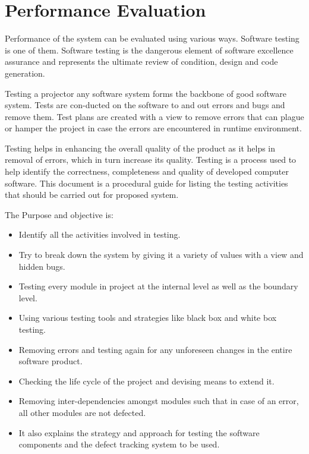 \documentclass[12pt, a4paper]{report}
\begin{document}
\chapter{Performance Evaluation}

Performance of the system can be evaluated using various ways. Software testing is one of them.
Software testing is the dangerous element of software excellence assurance and represents
the ultimate review of condition, design and code generation. \par Testing a projector
any software system forms the backbone of good software system. Tests are
con-ducted on the software to and out errors and bugs and remove them. Test plans
are created with a view to remove errors that can plague or hamper the project in case
the errors are encountered in runtime environment. \par Testing helps in enhancing the
overall quality of the product as it helps in removal of errors, which in turn increase
its quality. Testing is a process used to help identify the correctness, completeness
and quality of developed computer software. This document is a procedural guide
for listing the testing activities that should be carried out for proposed system.

The Purpose and objective is:
\begin{itemize}
	\item Identify all the activities involved in testing.
	\item Try to break down the system by giving it a variety of values with a view and
	hidden bugs.
	\item Testing every module in project at the internal level as well as the boundary
	level.
	\item Using various testing tools and strategies like black box and white box testing.
	\item Removing errors and testing again for any unforeseen changes in the entire
	software product.
	\item Checking the life cycle of the project and devising means to extend it.
	\item Removing inter-dependencies amongst modules such that in case of an error,
	all other modules are not defected.
	\item It also explains the strategy and approach for testing the software components
	and the defect tracking system to be used.
\end{itemize}
\end{document}
